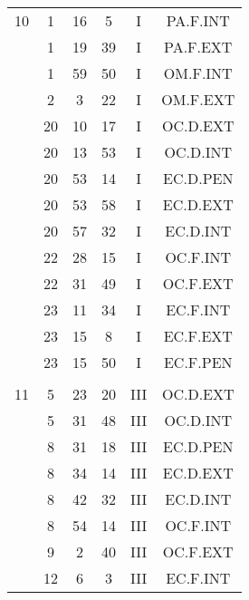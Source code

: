 \documentclass[12pt, a4paper]{article}
\begin{document}
\begin{multicols}{3}
{\begin{tabular}{c c c c c c}
	 	 	 	10 & 1 & 16 & 5 & I & PA.F.INT\\%
	 	 	 	 & 1 & 19 & 39 & I & PA.F.EXT\\%
	 	 	 	 & 1 & 59 & 50 & I & OM.F.INT\\%
	 	 	 	 & 2 & 3 & 22 & I & OM.F.EXT\\%
	 	 	 	 & 20 & 10 & 17 & I & OC.D.EXT\\%
	 	 	 	 & 20 & 13 & 53 & I & OC.D.INT\\%
	 	 	 	 & 20 & 53 & 14 & I & EC.D.PEN\\%
	 	 	 	 & 20 & 53 & 58 & I & EC.D.EXT\\%
	 	 	 	 & 20 & 57 & 32 & I & EC.D.INT\\%
	 	 	 	 & 22 & 28 & 15 & I & OC.F.INT\\%
	 	 	 	 & 22 & 31 & 49 & I & OC.F.EXT\\%
	 	 	 	 & 23 & 11 & 34 & I & EC.F.INT\\%
	 	 	 	 & 23 & 15 & 8 & I & EC.F.EXT\\%
	 	 	 	 & 23 & 15 & 50 & I & EC.F.PEN\\%
	 	 	 	 & & & & & \\%
	 	 	 	11 & 5 & 23 & 20 & III & OC.D.EXT\\%
	 	 	 	 & 5 & 31 & 48 & III & OC.D.INT\\%
	 	 	 	 & 8 & 31 & 18 & III & EC.D.PEN\\%
	 	 	 	 & 8 & 34 & 14 & III & EC.D.EXT\\%
	 	 	 	 & 8 & 42 & 32 & III & EC.D.INT\\%
	 	 	 	 & 8 & 54 & 14 & III & OC.F.INT\\%
	 	 	 	 & 9 & 2 & 40 & III & OC.F.EXT\\%
	 	 	 	 & 12 & 6 & 3 & III & EC.F.INT\\%

\end{tabular}}
\end{multicols}
\end{document}
